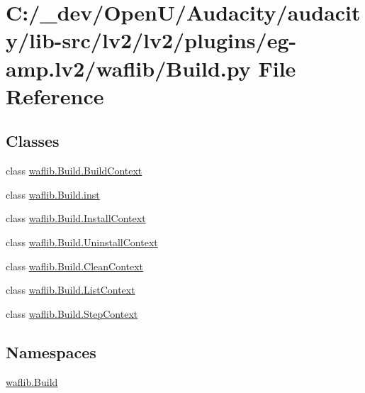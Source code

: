 \hypertarget{lv2_2plugins_2eg-amp_8lv2_2waflib_2_build_8py}{}\section{C\+:/\+\_\+dev/\+Open\+U/\+Audacity/audacity/lib-\/src/lv2/lv2/plugins/eg-\/amp.lv2/waflib/\+Build.py File Reference}
\label{lv2_2plugins_2eg-amp_8lv2_2waflib_2_build_8py}
\subsection*{Classes}
\begin{DoxyCompactItemize}
\item 
class \hyperlink{classwaflib_1_1_build_1_1_build_context}{waflib.\+Build.\+Build\+Context}
\item 
class \hyperlink{classwaflib_1_1_build_1_1inst}{waflib.\+Build.\+inst}
\item 
class \hyperlink{classwaflib_1_1_build_1_1_install_context}{waflib.\+Build.\+Install\+Context}
\item 
class \hyperlink{classwaflib_1_1_build_1_1_uninstall_context}{waflib.\+Build.\+Uninstall\+Context}
\item 
class \hyperlink{classwaflib_1_1_build_1_1_clean_context}{waflib.\+Build.\+Clean\+Context}
\item 
class \hyperlink{classwaflib_1_1_build_1_1_list_context}{waflib.\+Build.\+List\+Context}
\item 
class \hyperlink{classwaflib_1_1_build_1_1_step_context}{waflib.\+Build.\+Step\+Context}
\end{DoxyCompactItemize}
\subsection*{Namespaces}
\begin{DoxyCompactItemize}
\item 
 \hyperlink{namespacewaflib_1_1_build}{waflib.\+Build}
\end{DoxyCompactItemize}
